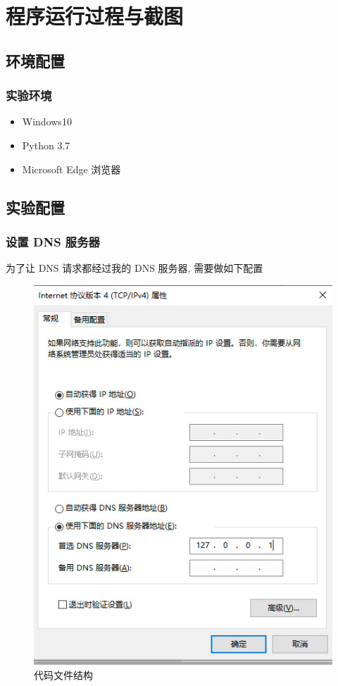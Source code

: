 \documentclass[UTF8]{article}
\begin{document}
\section{程序运行过程与截图}
\subsection{环境配置}
\subsubsection{实验环境}
\begin{itemize}
\item Windows10
\item Python 3.7
\item Microsoft Edge 浏览器
\end{itemize}
\subsection{实验配置}
\subsubsection{设置 DNS 服务器}
\noindent 为了让 DNS 请求都经过我的 DNS 服务器, 需要做如下配置
\begin{figure}[H]
	\centering
	\includegraphics[width=\linewidth/2]{configdns.png}
	\caption{代码文件结构}
\end{figure}\par
\end{document}
